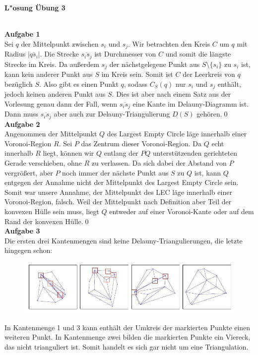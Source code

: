 \documentclass{article}
\newcommand{\serie}{3}
\begin{document}
\begin{large}
\textbf{L"osung \"Ubung \serie}\\ \\
\end{large}
\textbf{Aufgabe 1}\\
Sei $q$ der Mittelpunkt zwischen $s_i$ und $s_j$. Wir betrachten den Kreis $C$ um $q$ mit Radius $|\overline{qs_i}|$. Die Strecke $\overline{s_is_j}$ ist Durchmesser von $C$ und somit die l\"angste Strecke im Kreis. Da au\ss erdem $s_j$ der n\"achstgelegene Punkt aus $S\setminus \{s_i\}$ zu $s_i$ ist, kann kein anderer Punkt aus $S$ im Kreis sein. Somit ist $C$ der Leerkreis von $q$ bez\"uglich $S$. Also gibt es einen Punkt $q$, sodass $C_S(q)$ nur $s_i$ und $s_j$ enth\"alt, jedoch keinen anderen Punkt aus $S$. Dies ist aber nach einem Satz aus der Vorlesung genau dann der Fall, wenn $\overline{s_is_j}$ eine Kante im Delauny-Diagramm ist. Dann muss $\overline{s_is_j}$ aber auch zur Delauny-Triangulierung $D(S)$ geh\"oren.\qed\\

\textbf{Aufgabe 2}\\
Angenommen der Mittelpunkt $Q$ des Largest Empty Circle l\"age innerhalb einer Voronoi-Region $R$. Sei $P$ das Zentrum dieser Voronoi-Region. Da $Q$ echt innerhalb $R$ liegt, k\"onnen wir $Q$ entlang der $\overline{PQ}$ unterst\"utzenden gerichteten Gerade verschieben, ohne $R$ zu verlassen. Da sich dabei der Abstand von $P$ vergr\"o\ss ert, aber $P$ noch immer der n\"achste Punkt aus $S$ zu $Q$ ist,  kann $Q$ entgegen der Annahme nicht der Mittelpunkt des Largest Empty Circle sein. Somit war unsere Annahme, der Mittelpunkt des LEC l\"age innerhalb einer Voronoi-Region, falsch. Weil der Mittelpunkt nach Definition aber Teil der konvexen H\"ulle sein muss, liegt $Q$ entweder auf einer Voronoi-Kante oder auf dem Rand der konvexen H\"ulle.\qed\\

\textbf{Aufgabe 3}\\
Die ersten drei Kantenmengen sind keine Delauny-Triangulierungen, die letzte hingegen schon:

\begin{figure}[h]
\includegraphics[width=\textwidth]{a3}
\end{figure}
In Kantenmenge 1 und 3 kann enth\"alt der Umkreis der markierten Punkte einen weiteren Punkt. In Kantenmenge zwei bilden die markierten Punkte ein Viereck, das nicht trianguliert ist. Somit handelt es sich gar nicht um eine Triangulation.\\
\end{document}
